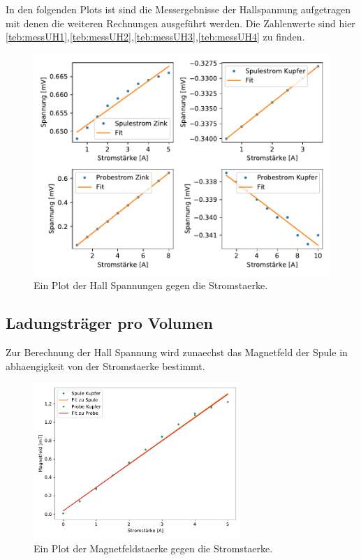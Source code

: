    In den folgenden Plots ist sind die Messergebnisse der Hallspannung aufgetragen mit denen die weiteren Rechnungen ausgeführt werden.
    Die Zahlenwerte sind hier \ref{teb:messUH1},\ref{teb:messUH2},\ref{teb:messUH3},\ref{teb:messUH4} zu finden.

    \begin{figure}[H]
        \centering
        \includegraphics[width=1.1\textwidth]{build/Hall.pdf}
        \caption{Ein Plot der Hall Spannungen gegen die Stromstaerke.}
        \label{img:messHall}
    \end{figure}
    
     
    \subsection{Ladungsträger pro Volumen}
    

    Zur Berechnung der Hall Spannung wird zunaechst das Magnetfeld der Spule in abhaengigkeit von der Stromstaerke bestimmt.

    \begin{figure}[H]
        \centering
        \includegraphics[width=0.7\textwidth]{build/Magnetfeld.pdf}
        \caption{Ein Plot der Magnetfeldstaerke gegen die Stromstaerke.}
        \label{img:Magnetfeld}
    \end{figure}

